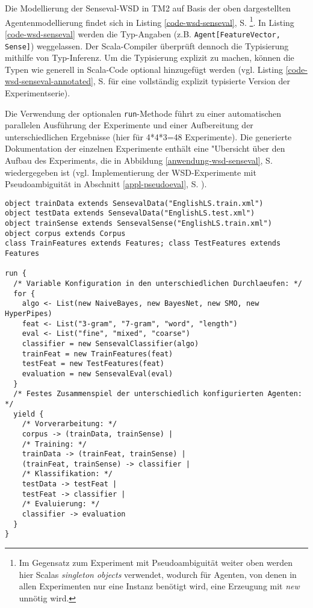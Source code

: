 \documentclass[abstracton, 12pt]{scrartcl}
\begin{document}
Die Modellierung der Senseval-WSD in TM2 auf Basis der oben dargestellten Agentenmodellierung findet sich in Listing \ref{code-wsd-senseval}, S. \pageref{code-wsd-senseval}\footnote{Im Gegensatz zum Experiment mit Pseudoambiguität weiter oben werden hier Scalas \emph{singleton objects} verwendet, wodurch für Agenten, von denen in allen Experimenten nur eine Instanz benötigt wird, eine Erzeugung mit \emph{new} unnötig wird.}. In Listing \ref{code-wsd-senseval} werden die Typ-Angaben (z.B. \lstinline!Agent[FeatureVector, Sense]!) weggelassen. Der Scala-Compiler überprüft dennoch die Typisierung mithilfe von Typ-Inferenz. Um die Typisierung explizit zu machen, können die Typen wie generell in Scala-Code optional hinzugefügt werden (vgl. Listing \ref{code-wsd-senseval-annotated}, S. \pageref{code-wsd-senseval-annotated} für eine vollständig explizit typisierte Version der Experimentserie).

Die Verwendung der optionalen \lstinline!run!-Methode führt zu einer automatischen parallelen Ausführung der Experimente und einer Aufbereitung der unterschiedlichen Ergebnisse (hier für 4*4*3=48 Experimente). Die generierte Dokumentation der einzelnen Experimente enthält eine "Ubersicht über den Aufbau des Experiments, die in Abbildung \ref{anwendung-wsd-senseval}, S. \pageref{anwendung-wsd-senseval} wiedergegeben ist (vgl. Implementierung der WSD-Experimente mit Pseudoambiguität in Abschnitt \ref{appl-pseudoeval}, S. \pageref{appl-pseudoeval}).

\begin{lstlisting}[float, label=code-wsd-senseval, caption={WSD-Experiment mit Senseval-Daten, vgl. Abb. \ref{anwendung-wsd-senseval}, S. \pageref{anwendung-wsd-senseval}}]
object trainData extends SensevalData("EnglishLS.train.xml")
object testData extends SensevalData("EnglishLS.test.xml")
object trainSense extends SensevalSense("EnglishLS.train.xml")
object corpus extends Corpus
class TrainFeatures extends Features; class TestFeatures extends Features

run {
  /* Variable Konfiguration in den unterschiedlichen Durchlaeufen: */
  for {
    algo <- List(new NaiveBayes, new BayesNet, new SMO, new HyperPipes)
    feat <- List("3-gram", "7-gram", "word", "length")
    eval <- List("fine", "mixed", "coarse")
    classifier = new SensevalClassifier(algo)
    trainFeat = new TrainFeatures(feat)
    testFeat = new TestFeatures(feat)
    evaluation = new SensevalEval(eval)
  }
  /* Festes Zusammenspiel der unterschiedlich konfigurierten Agenten: */
  yield {
    /* Vorverarbeitung: */
    corpus -> (trainData, trainSense) | 
    /* Training: */
    trainData -> (trainFeat, trainSense) | 
    (trainFeat, trainSense) -> classifier |
    /* Klassifikation: */
    testData -> testFeat |
    testFeat -> classifier |
    /* Evaluierung: */
    classifier -> evaluation
  }
}
\end{lstlisting}
\end{document}
